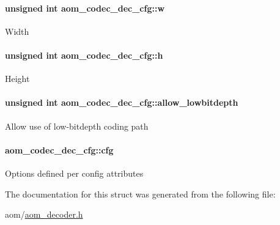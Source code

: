 \paragraph[{\texorpdfstring{w}{w}}]{\setlength{\rightskip}{0pt plus 5cm}unsigned int aom\+\_\+codec\+\_\+dec\+\_\+cfg\+::w}\hypertarget{structaom__codec__dec__cfg_a107d66882f85eaaee59e59ea23d974d6}{}\label{structaom__codec__dec__cfg_a107d66882f85eaaee59e59ea23d974d6}
Width 
\paragraph[{\texorpdfstring{h}{h}}]{\setlength{\rightskip}{0pt plus 5cm}unsigned int aom\+\_\+codec\+\_\+dec\+\_\+cfg\+::h}\hypertarget{structaom__codec__dec__cfg_a441611a22188289243eafa7df433e85f}{}\label{structaom__codec__dec__cfg_a441611a22188289243eafa7df433e85f}
Height 
\paragraph[{\texorpdfstring{allow\+\_\+lowbitdepth}{allow_lowbitdepth}}]{\setlength{\rightskip}{0pt plus 5cm}unsigned int aom\+\_\+codec\+\_\+dec\+\_\+cfg\+::allow\+\_\+lowbitdepth}\hypertarget{structaom__codec__dec__cfg_afe4d704d679b943d566dcd4fd2276851}{}\label{structaom__codec__dec__cfg_afe4d704d679b943d566dcd4fd2276851}
Allow use of low-\/bitdepth coding path 
\paragraph[{\texorpdfstring{cfg}{cfg}}]{ aom\+\_\+codec\+\_\+dec\+\_\+cfg\+::cfg}\hypertarget{structaom__codec__dec__cfg_ae47ad67c30783b231e16eee32f573e1d}{}\label{structaom__codec__dec__cfg_ae47ad67c30783b231e16eee32f573e1d}
Options defined per config attributes 

The documentation for this struct was generated from the following file\+:\begin{DoxyCompactItemize}
\item 
aom/\hyperlink{aom__decoder_8h}{aom\+\_\+decoder.\+h}\end{DoxyCompactItemize}
